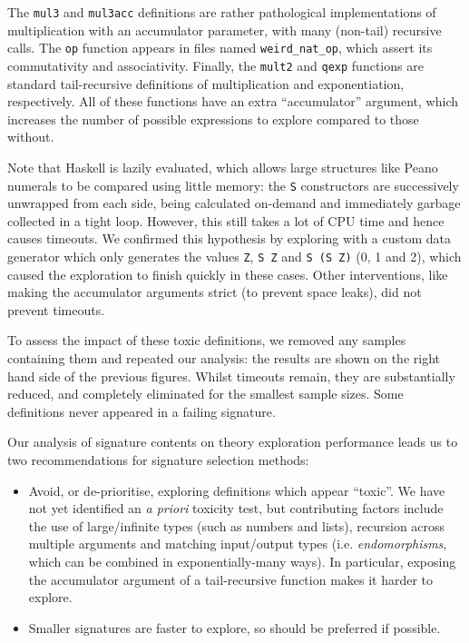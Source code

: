 The \texttt{mul3} and \texttt{mul3acc} definitions are rather pathological
implementations of multiplication with an accumulator parameter, with many
(non-tail) recursive calls. The \texttt{op} function appears in files named
\texttt{weird\_nat\_op}, which assert its commutativity and associativity.
Finally, the \texttt{mult2} and \texttt{qexp} functions are standard
tail-recursive definitions of multiplication and exponentiation, respectively.
All of these functions have an extra ``accumulator'' argument, which increases
the number of possible expressions to explore compared to those without.

Note that Haskell is lazily evaluated, which allows large structures like Peano
numerals to be compared using little memory: the \texttt{S} constructors are
successively unwrapped from each side, being calculated on-demand and
immediately garbage collected in a tight loop. However, this still takes a lot
of CPU time and hence causes timeouts. We confirmed this hypothesis by exploring
with a custom data generator which only generates the values \texttt{Z},
\texttt{S Z} and \texttt{S (S Z)} (0, 1 and 2), which caused the exploration to
finish quickly in these cases. Other interventions, like making the accumulator
arguments strict (to prevent space leaks), did not prevent timeouts.

To assess the impact of these toxic definitions, we removed any samples
containing them and repeated our analysis: the results are shown on the right
hand side of the previous figures. Whilst timeouts remain, they are
substantially reduced, and completely eliminated for the smallest sample sizes.
Some definitions never appeared in a failing signature.

Our analysis of signature contents on theory exploration performance leads us to
two recommendations for signature selection methods:

\begin{itemize}
\item Avoid, or de-prioritise, exploring definitions which appear ``toxic''.
  We have not yet identified an \emph{a priori} toxicity test, but contributing
  factors include the use of large/infinite types (such as numbers and lists),
  recursion across multiple arguments and matching input/output types (i.e.
  \emph{endomorphisms}, which can be combined in exponentially-many ways).
  In particular, exposing the accumulator argument of a tail-recursive function
  makes it harder to explore. \iffalse TODO: Alison: These should be in the
  contributions and further recommendations based on your other findings in this
  chapter \fi
\item Smaller signatures are faster to explore, so should be preferred if
  possible.
\end{itemize}

